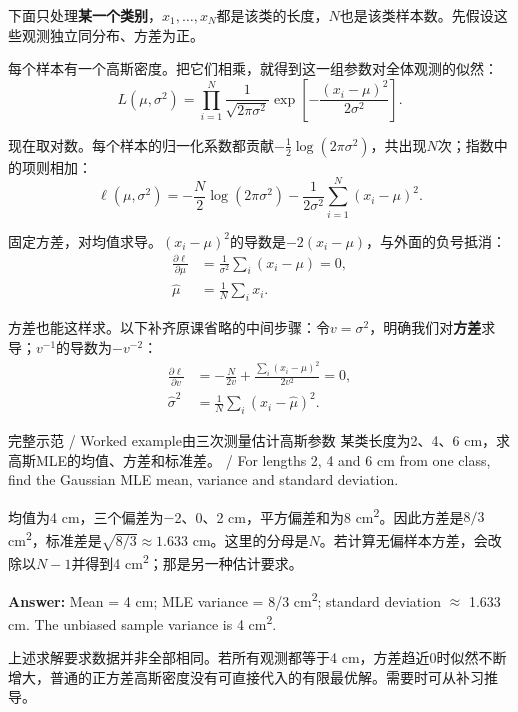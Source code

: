 下面只处理\textbf{某一个类别}，\(x_1,\ldots,x_N\)都是该类的长度，\(N\)也是该类样本数。先假设这些观测独立同分布、方差为正。


每个样本有一个高斯密度。把它们相乘，就得到这一组参数对全体观测的似然：
\[
L(\mu,\sigma^2)=\prod_{i=1}^N
\frac{1}{\sqrt{2\pi\sigma^2}}
\exp\!\left[-\frac{(x_i-\mu)^2}{2\sigma^2}\right].
\tag{2.8}
\]


现在取对数。每个样本的归一化系数都贡献\(-\tfrac12\log(2\pi\sigma^2)\)，共出现\(N\)次；指数中的项则相加：
\[
\ell(\mu,\sigma^2)=-\frac N2\log(2\pi\sigma^2)
-\frac{1}{2\sigma^2}\sum_{i=1}^N(x_i-\mu)^2.
\tag{2.9}
\]


固定方差，对均值求导。\((x_i-\mu)^2\)的导数是\(-2(x_i-\mu)\)，与外面的负号抵消：
\[
\begin{aligned}
\frac{\partial\ell}{\partial\mu}&=\frac1{\sigma^2}\sum_i(x_i-\mu)=0,\\
\hat\mu&=\frac1N\sum_i x_i.
\end{aligned}
\tag{2.10}
\]


方差也能这样求。以下补齐原课省略的中间步骤：令\(v=\sigma^2\)，明确我们对\textbf{方差}求导；\(v^{-1}\)的导数为\(-v^{-2}\)：
\[
\begin{aligned}
\frac{\partial\ell}{\partial v}&=-\frac N{2v}+\frac{\sum_i(x_i-\mu)^2}{2v^2}=0,\\
\hat\sigma^2&=\frac1N\sum_i(x_i-\hat\mu)^2.
\end{aligned}
\tag{2.11}
\]


\begin{StudyBlock}{完整示范 / Worked example}{由三次测量估计高斯参数}
某类长度为2、4、6 cm，求高斯MLE的均值、方差和标准差。 / For lengths 2, 4 and 6 cm from one class, find the Gaussian MLE mean, variance and standard deviation.


均值为4 cm，三个偏差为\ensuremath{-}2、0、2 cm，平方偏差和为8 cm\textsuperscript{2}。因此方差是\(8/3\) cm\textsuperscript{2}，标准差是\(\sqrt{8/3}\approx1.633\) cm。这里的分母是\(N\)。若计算无偏样本方差，会改除以\(N-1\)并得到4 cm\textsuperscript{2}；那是另一种估计要求。


\textbf{Answer:} Mean = 4 cm; MLE variance = 8/3 cm\textsuperscript{2}; standard deviation \ensuremath{\approx} 1.633 cm. The unbiased sample variance is 4 cm\textsuperscript{2}.


上述求解要求数据并非全部相同。若所有观测都等于4 cm，方差趋近0时似然不断增大，普通的正方差高斯密度没有可直接代入的有限最优解。需要时可从补习推导。
\end{StudyBlock}

